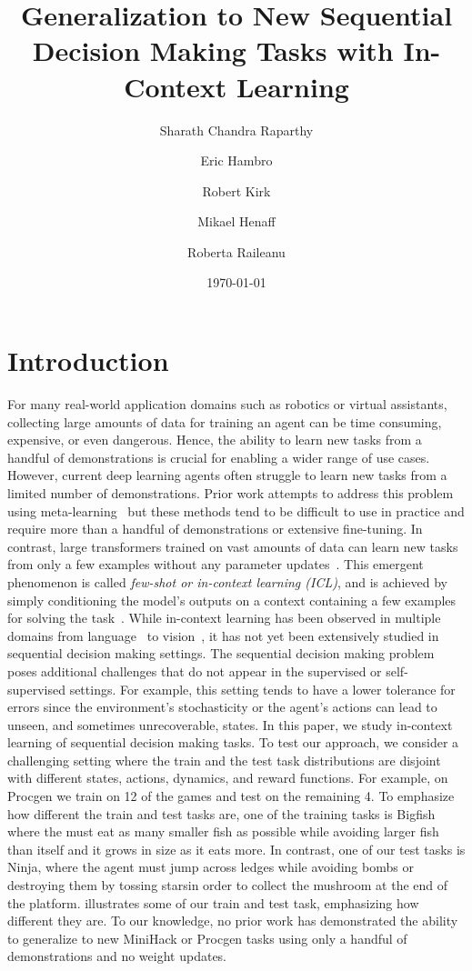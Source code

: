 \documentclass[]{fairmeta}
\title{Generalization to New Sequential Decision Making Tasks with In-Context Learning}
\author[1,*]{Sharath Chandra Raparthy}
\author[1]{Eric Hambro}
\author[1,2]{Robert Kirk}
\author[1,\dagger]{Mikael Henaff}
\author[1,2,\dagger]{Roberta Raileanu}
\affiliation[1]{FAIR at Meta}
\affiliation[2]{UCL}
\date{\today}
\begin{document}
\maketitle
\section{Introduction}
For many real-world application domains such as robotics or virtual assistants, collecting large amounts of data for training an agent can be time consuming, expensive, or even dangerous.
Hence, the ability to learn new tasks from a handful of demonstrations is crucial for enabling a wider range of use cases.
However, current deep learning agents often struggle to learn new tasks from a limited number of demonstrations.
Prior work attempts to address this problem using meta-learning~\citep{schmidhuber1987evolutionary,duan2016rl,finn2017model,pong2022offline, mitchell2021offline,beck2023survey} but these methods tend to be difficult to use in practice and require more than a handful of demonstrations or extensive fine-tuning.
In contrast, large transformers trained on vast amounts of data can learn new tasks from only a few examples without any parameter updates~\citep{gpt3, scaling-laws, olsson2022incontext, zipfian_icl}. This emergent phenomenon is called \textit{few-shot or in-context learning (ICL)}, and is achieved by simply conditioning the model's outputs on a context containing a few examples for solving the task~\citep{gpt3, Ganguli_2022, wei2022emergent}.
While in-context learning has been observed in multiple domains from language~\citep{gpt3} to vision~\citep{zipfian_icl}, it has not yet been extensively studied in sequential decision making settings. The sequential decision making problem poses additional challenges that do not appear in the supervised or self-supervised settings. For example, this setting tends to have a lower tolerance for errors since the environment's stochasticity or the agent's actions can lead to unseen, and sometimes unrecoverable, states.
In this paper, we study in-context learning of sequential decision making tasks. To test our approach, we consider a challenging setting where the train and the test task distributions are disjoint with different states, actions, dynamics, and reward functions. For example, on Procgen we train on 12 of the games and test on the remaining 4. To emphasize how different the train and test tasks are, one of the training tasks is Bigfish where the must eat as many smaller fish as possible while avoiding larger fish than itself and it grows in size as it eats more. In contrast, one of our test tasks is Ninja, where the agent must jump across ledges while avoiding bombs or destroying them by tossing starsin order to collect the mushroom at the end of the platform.  illustrates some of our train and test task, emphasizing how different they are. To our knowledge, no prior work has demonstrated the ability to generalize to new MiniHack or Procgen tasks using only a handful of demonstrations and no weight updates.
\end{document}
